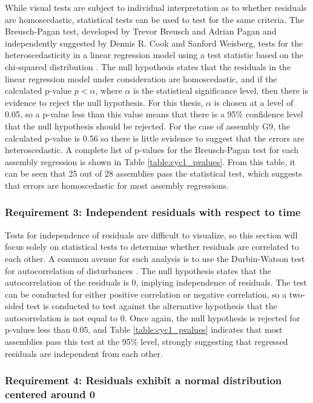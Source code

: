 \documentclass{article}
\begin{document}
While visual tests are subject to individual interpretation as to whether residuals are homoscedastic, statistical tests can be used to test for the same criteria. The Breusch-Pagan test, developed by Trevor Breusch and Adrian Pagan and independently suggested by Dennis R. Cook and Sanford Weisberg, tests for the heteroscedasticity in a linear regression model using a test statistic based on the chi-squared distribution \cite{breusch1979simple,cook1983diagnostics}. The null hypothesis states that the residuals in the linear regression model under consideration are homoscedastic, and if the calculated p-value $p<\alpha$, where $\alpha$ is the statistical significance level, then there is evidence to reject the null hypothesis. For this thesis, $\alpha$ is chosen at a level of 0.05, so a p-value less than this value means that there is a 95\% confidence level that the null hypothesis should be rejected. For the case of assembly G9, the calculated p-value is 0.56 so there is little evidence to suggest that the errors are heteroscedastic. A complete list of p-values for the Breusch-Pagan test for each assembly regression is shown in Table \ref{table:cyc1_pvalues}. From this table, it can be seen that 25 out of 28 assemblies pass the statistical test, which suggests that errors are homoscedastic for most assembly regressions.

\subsubsection*{Requirement 3: Independent residuals with respect to time}

Tests for independence of residuals are difficult to visualize, so this section will focus solely on statistical tests to determine whether residuals are correlated to each other. A common avenue for such analysis is to use the Durbin-Watson test for autocorrelation of disturbances \cite{durbin1950testing,faraway2014linear}. The null hypothesis states that the autocorrelation of the residuals is 0, implying independence of residuals. The test can be conducted for either positive correlation or negative correlation, so a two-sided test is conducted to test against the alternative hypothesis that the autocorrelation is not equal to 0. Once again, the null hypothesis is rejected for p-values less than 0.05, and Table \ref{table:cyc1_pvalues} indicates that most assemblies pass this test at the 95\% level, strongly suggesting that regressed residuals are independent from each other.

\subsubsection*{Requirement 4: Residuals exhibit a normal distribution centered around 0}
\end{document}
